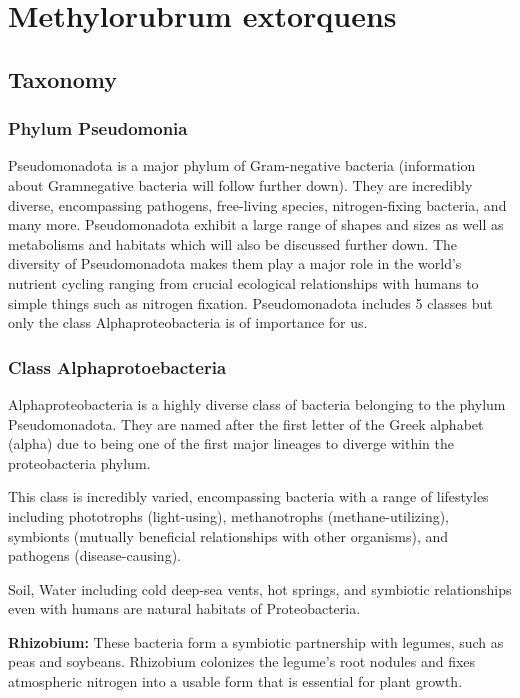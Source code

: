 \chapter{Methylorubrum extorquens\authorB{}}


\section{{Taxonomy}}

\subsection{Phylum Pseudomonia}
Pseudomonadota is a major phylum of Gram-negative bacteria (information about Gramnegative bacteria will follow further down). They are incredibly diverse, encompassing
pathogens, free-living species, nitrogen-fixing bacteria, and many more.
Pseudomonadota exhibit a large range of shapes and sizes as well as metabolisms and
habitats which will also be discussed further down. The diversity of Pseudomonadota
makes them play a major role in the world's nutrient cycling ranging from crucial
ecological relationships with humans to simple things such as nitrogen fixation.
Pseudomonadota includes 5 classes but only the class Alphaproteobacteria is of
importance for us.

\subsection{Class Alphaprotoebacteria}
Alphaproteobacteria is a highly diverse class of bacteria belonging to the phylum
Pseudomonadota.
They are named after the first letter of the Greek alphabet (alpha) due
to being one of the first major lineages to diverge within the proteobacteria phylum.

This class is incredibly varied, encompassing bacteria with a range of lifestyles including
phototrophs (light-using), methanotrophs (methane-utilizing), symbionts (mutually
beneficial relationships with other organisms), and pathogens (disease-causing).

Soil, Water including cold deep-sea vents, hot springs, and symbiotic relationships even
with humans are natural habitats of Proteobacteria.

\textbf{Rhizobium:} These bacteria form a symbiotic partnership with legumes, such as peas and
soybeans.
Rhizobium colonizes the legume's root nodules and fixes atmospheric nitrogen
into a usable form that is essential for plant growth.

